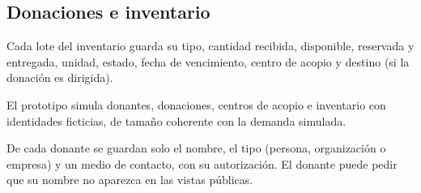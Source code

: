 \subsection{Donaciones e inventario}
\begin{description}[leftmargin=0pt]
  \item[RD-21 (\Must).] Cada lote del inventario guarda su tipo, cantidad recibida, disponible, reservada y entregada, unidad, estado, fecha de vencimiento, centro de acopio y destino (si la donación es dirigida).
  \item[RD-22 (\Must).] El prototipo simula donantes, donaciones, centros de acopio e inventario con identidades ficticias, de tamaño coherente con la demanda simulada.
  \item[RD-23 (\Should).] De cada donante se guardan solo el nombre, el tipo (persona, organización o empresa) y un medio de contacto, con su autorización. El donante puede pedir que su nombre no aparezca en las vistas públicas.
\end{description}
